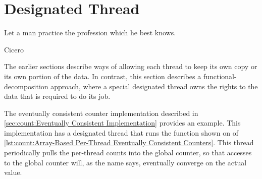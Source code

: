 \QuickQuizEnd

\section{Designated Thread}
\label{sec:owned:Designated Thread}
%
\epigraph{Let a man practice the profession which he best knows.}
	 {Cicero}

The earlier sections describe ways of allowing each thread to keep its
own copy or its own portion of the data.
In contrast, this section describes a functional-decomposition approach,
where a special designated thread owns the rights to the data
that is required to do its job.
\begin{fcvref}
The eventually consistent counter implementation described in
\cref{sec:count:Eventually Consistent Implementation} provides an example.
This implementation has a designated thread that runs the
 function shown on  of
\cref{lst:count:Array-Based Per-Thread Eventually Consistent Counters}.
This  thread periodically pulls the per-thread counts
into the global counter, so that accesses to the global counter will,
as the name says, eventually converge on the actual value.
\end{fcvref}

